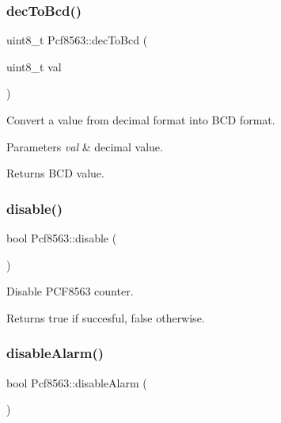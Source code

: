\subsubsection{\texorpdfstring{dec\+To\+Bcd()}{decToBcd()}}
{\footnotesize\ttfamily uint8\+\_\+t Pcf8563\+::dec\+To\+Bcd (\begin{DoxyParamCaption}\item[{uint8\+\_\+t}]{val }\end{DoxyParamCaption})}



Convert a value from decimal format into B\+CD format. 


\begin{DoxyParams}{Parameters}
{\em val} & decimal value. \\
\hline
\end{DoxyParams}
\begin{DoxyReturn}{Returns}
B\+CD value. 
\end{DoxyReturn}
\mbox{\label{namespacePcf8563_a1920171d3aec259327a124b712299a04}} 
\subsubsection{\texorpdfstring{disable()}{disable()}}
{\footnotesize\ttfamily bool Pcf8563\+::disable (\begin{DoxyParamCaption}{ }\end{DoxyParamCaption})}



Disable P\+C\+F8563 counter. 

\begin{DoxyReturn}{Returns}
true if succesful, false otherwise. 
\end{DoxyReturn}
\mbox{\label{namespacePcf8563_ad9dd3fe9bf1ab196090357b717c7207d}} 
\subsubsection{\texorpdfstring{disable\+Alarm()}{disableAlarm()}}
{\footnotesize\ttfamily bool Pcf8563\+::disable\+Alarm (\begin{DoxyParamCaption}{ }\end{DoxyParamCaption})}



